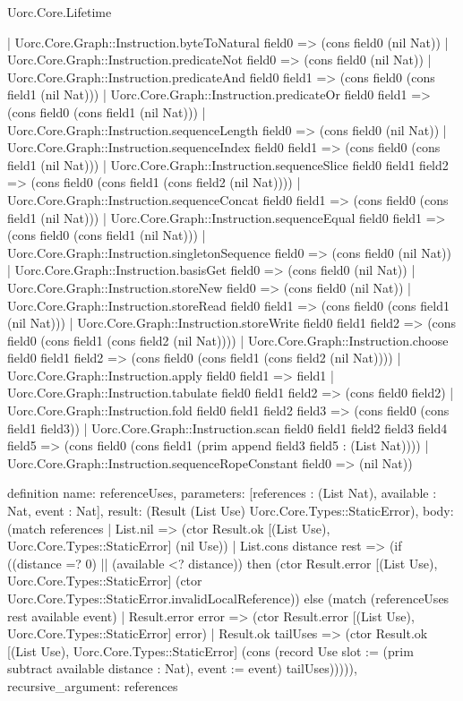 \begin{lexlean}{Uorc.Core.Lifetime}
\begin{semanticmodule}
{    | Uorc.Core.Graph::Instruction.byteToNatural field0 => (cons field0 (nil Nat))
    | Uorc.Core.Graph::Instruction.predicateNot field0 => (cons field0 (nil Nat))
    | Uorc.Core.Graph::Instruction.predicateAnd field0 field1 => (cons field0 (cons field1 (nil Nat)))
    | Uorc.Core.Graph::Instruction.predicateOr field0 field1 => (cons field0 (cons field1 (nil Nat)))
    | Uorc.Core.Graph::Instruction.sequenceLength field0 => (cons field0 (nil Nat))
    | Uorc.Core.Graph::Instruction.sequenceIndex field0 field1 => (cons field0 (cons field1 (nil Nat)))
    | Uorc.Core.Graph::Instruction.sequenceSlice field0 field1 field2 => (cons field0 (cons field1 (cons field2 (nil Nat))))
    | Uorc.Core.Graph::Instruction.sequenceConcat field0 field1 => (cons field0 (cons field1 (nil Nat)))
    | Uorc.Core.Graph::Instruction.sequenceEqual field0 field1 => (cons field0 (cons field1 (nil Nat)))
    | Uorc.Core.Graph::Instruction.singletonSequence field0 => (cons field0 (nil Nat))
    | Uorc.Core.Graph::Instruction.basisGet field0 => (cons field0 (nil Nat))
    | Uorc.Core.Graph::Instruction.storeNew field0 => (cons field0 (nil Nat))
    | Uorc.Core.Graph::Instruction.storeRead field0 field1 => (cons field0 (cons field1 (nil Nat)))
    | Uorc.Core.Graph::Instruction.storeWrite field0 field1 field2 => (cons field0 (cons field1 (cons field2 (nil Nat))))
    | Uorc.Core.Graph::Instruction.choose field0 field1 field2 => (cons field0 (cons field1 (cons field2 (nil Nat))))
    | Uorc.Core.Graph::Instruction.apply field0 field1 => field1
    | Uorc.Core.Graph::Instruction.tabulate field0 field1 field2 => (cons field0 field2)
    | Uorc.Core.Graph::Instruction.fold field0 field1 field2 field3 => (cons field0 (cons field1 field3))
    | Uorc.Core.Graph::Instruction.scan field0 field1 field2 field3 field4 field5 => (cons field0 (cons field1 (prim append field3 field5 : (List Nat))))
    | Uorc.Core.Graph::Instruction.sequenceRopeConstant field0 => (nil Nat))
}

definition{
  name: referenceUses,
  parameters: [references : (List Nat), available : Nat, event : Nat],
  result: (Result (List Use) Uorc.Core.Types::StaticError),
  body: (match references
    | List.nil => (ctor Result.ok [(List Use), Uorc.Core.Types::StaticError] (nil Use))
    | List.cons distance rest => (if ((distance =? 0) || (available <? distance)) then (ctor Result.error [(List Use), Uorc.Core.Types::StaticError] (ctor Uorc.Core.Types::StaticError.invalidLocalReference)) else (match (referenceUses rest available event)
      | Result.error error => (ctor Result.error [(List Use), Uorc.Core.Types::StaticError] error)
      | Result.ok tailUses => (ctor Result.ok [(List Use), Uorc.Core.Types::StaticError] (cons (record Use {slot := (prim subtract available distance : Nat), event := event}) tailUses))))),
  recursive_argument: references
}


\end{semanticmodule}
\end{lexlean}
